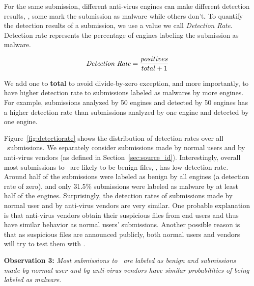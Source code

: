 For the same submission, different anti-virus engines can make different detection results, \ie, 
some mark the submission as malware while others don't.
To quantify the detection results of a submission,
we use a value we call {\em Detection Rate}.
Detection rate represents the percentage of engines labeling the submission as malware. 

$$ \textrm{\textit{Detection Rate}} = \dfrac{positives}{total + 1}$$

We add one to {\bf total} to avoid divide-by-zero exception, and more importantly, 
to have higher detection rate to submissions labeled as malwares by more engines.
For example, submissions analyzed by 50 engines and detected by 50 engines 
has a higher detection rate 
than submissions analyzed by one engine and detected by one engine. 

Figure~\ref{fig:detectiorate} shows the distribution of detection rates over all \pe\ submissions.
We separately consider submissions made by normal users and by anti-virus vendors 
(as defined in Section~\ref{sec:source_id}).
Interestingly, overall most submissions to \vt\ are likely to be benign files, \ie, has low detection rate.
Around half of the submissions were labeled as benign by all engines (a detection rate of zero),
and only 31.5\% submissions were labeled as malware by at least half of the engines.
Surprisingly, the detection rates of submissions made by normal user and by anti-virus vendors are very similar.
One probable explanation is that anti-virus vendors obtain their suspicious files 
from end users and thus have similar behavior as normal users' submissions.
Another possible reason is that as suspicious files are announced publicly, 
both normal users and vendors will try to test them with \vt.



{\bf Observation 3:} 
{\em Most submissions to \vt\ are labeled as benign and 
submissions made by normal user and by anti-virus vendors have similar probabilities of being labeled as malware.}


